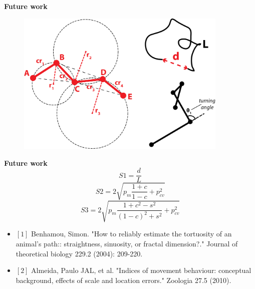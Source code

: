 \documentclass{beamer}
\begin{document}
{\begin{frame}{\textbf{Future work}}
	\begin{figure}[H]
		\centering
		\includegraphics[width=0.9\textwidth]{figures/pathfeatures3}
	\end{figure}	
\end{frame}

\begin{frame}{\textbf{Future work}}
	\begin{equation}
		S1 = \frac{d}{L}
	\end{equation}
	\vspace{4mm}
	\begin{equation}
		S2 = 2\sqrt{p_m\frac{1+c}{1-c}+p_{cv}^2}
	\end{equation}	
	\vspace{4mm}
	\begin{equation}
		S3 = 2\sqrt{p_m\frac{1+c^2-s^2}{(1-c)^2+s^2}+p_{cv}^2}
	\end{equation}	
	\vspace{10mm}
	\tiny{
	\begin{itemize}
		\item $[1]$ Benhamou, Simon. "How to reliably estimate the tortuosity of an animal's path:: straightness, sinuosity, or fractal dimension?." Journal of theoretical biology 229.2 (2004): 209-220.
		\item $[2]$ Almeida, Paulo JAL, et al. "Indices of movement behaviour: conceptual background, effects of scale and location errors." Zoologia 27.5 (2010).
	\end{itemize}
	}		
\end{frame}

}
\end{document}
